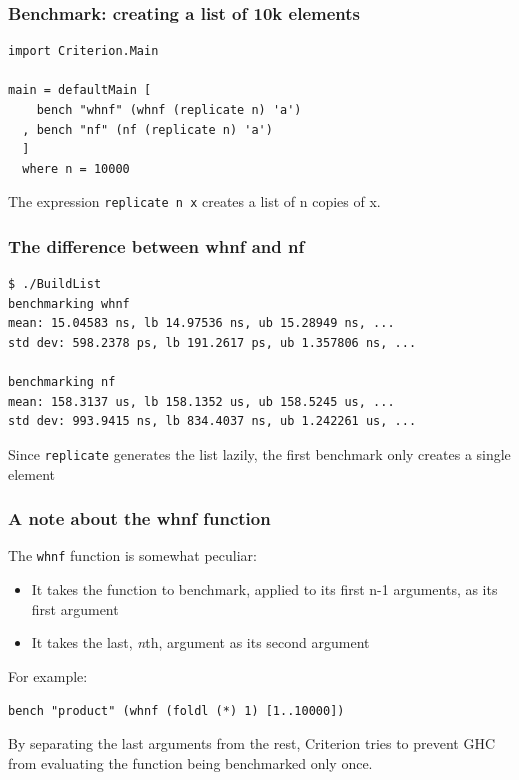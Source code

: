 \documentclass{beamer}
\begin{document}
\begin{frame}[fragile]
  \frametitle{Benchmark: creating a list of 10k elements}

  \begin{lstlisting}
import Criterion.Main

main = defaultMain [
    bench "whnf" (whnf (replicate n) 'a')
  , bench "nf" (nf (replicate n) 'a')
  ]
  where n = 10000
  \end{lstlisting}

  The expression \lstinline!replicate n x! creates a list of n copies
  of x.
\end{frame}

\begin{frame}[fragile]
  \frametitle{The difference between whnf and nf}

  \begin{verbatim}
$ ./BuildList
benchmarking whnf
mean: 15.04583 ns, lb 14.97536 ns, ub 15.28949 ns, ...
std dev: 598.2378 ps, lb 191.2617 ps, ub 1.357806 ns, ...

benchmarking nf
mean: 158.3137 us, lb 158.1352 us, ub 158.5245 us, ...
std dev: 993.9415 ns, lb 834.4037 ns, ub 1.242261 us, ...
  \end{verbatim}

  Since \lstinline!replicate! generates the list lazily, the first
  benchmark only creates a single element
\end{frame}

\begin{frame}[fragile]
  \frametitle{A note about the whnf function}

  The \lstinline!whnf! function is somewhat peculiar:
  \begin{itemize}
  \item It takes the function to benchmark, applied to its first n-1
    arguments, as its first argument
  \item It takes the last, \emph{n}th, argument as its second argument
  \end{itemize}
  For example:
  \begin{lstlisting}
bench "product" (whnf (foldl (*) 1) [1..10000])
  \end{lstlisting}
By separating the last arguments from the rest, Criterion tries to
prevent GHC from evaluating the function being benchmarked only once.
\end{frame}
\end{document}
